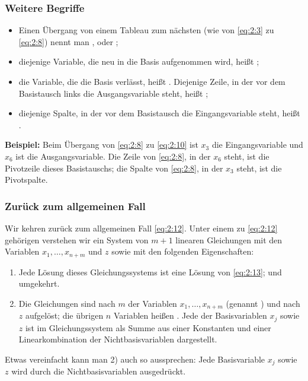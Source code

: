 \documentclass[smaller]{beamer}
\begin{document}
\begin{frame}
 \frametitle{Weitere Begriffe}
 \begin{itemize}
 \item Einen Übergang von einem Tableau zum nächsten (wie von \eqref{eq:2:3} zu \eqref{eq:2:8}) nennt man ,  oder ;
 \item diejenige Variable, die neu in die Basis aufgenommen wird, heißt ;
 \item die Variable, die die Basis verlässt, heißt . Diejenige Zeile, in der vor dem Basistausch links die Ausgangsvariable steht, heißt ;
 \item diejenige Spalte, in der vor dem Basistausch die Eingangsvariable steht, heißt .
 \end{itemize}
 
\textbf{Beispiel:} Beim Übergang von \eqref{eq:2:8} zu \eqref{eq:2:10} ist $x_3$ die Eingangsvariable und $x_6$ ist die Ausgangsvariable. Die Zeile von \eqref{eq:2:8}, in der $x_6$ steht, ist die Pivotzeile dieses Basistauschs; die Spalte von \eqref{eq:2:8}, in der $x_3$ steht, ist die Pivotspalte.
\end{frame}

\begin{frame}
 \frametitle{Zurück zum allgemeinen Fall}
 Wir kehren zurück zum allgemeinen Fall \eqref{eq:2:12}. Unter einem zu \eqref{eq:2:12} gehörigen  verstehen wir ein System von $m+1$ linearen Gleichungen mit den Variablen $x_1,\ldots,x_{n+m}$ und $z$ sowie mit den folgenden Eigenschaften:
\begin{enumerate}[1)]
\item Jede Lösung dieses Gleichungssystems ist eine Lösung von \eqref{eq:2:13}; und umgekehrt.
\item Die Gleichungen sind nach $m$ der Variablen $x_1,\ldots,x_{n+m}$ (genannt ) und nach $z$ aufgelöst; die übrigen $n$ Variablen heißen . Jede der Basisvariablen $x_j$ sowie $z$ ist im Gleichungssystem als Summe aus einer Konstanten und einer Linearkombination der Nichtbasisvariablen dargestellt.
\end{enumerate}

Etwas vereinfacht kann man 2) auch so aussprechen: \alert{Jede Basisvariable $x_j$ sowie $z$ wird durch die Nichtbasisvariablen ausgedrückt}.
\end{frame}
\end{document}
